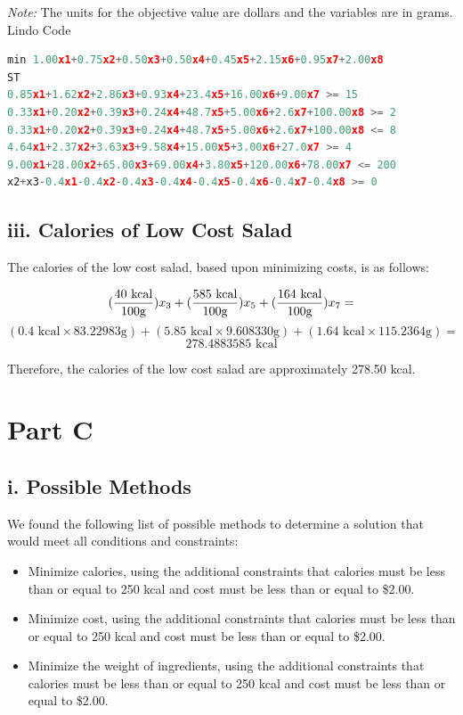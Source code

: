 \documentclass[11pt]{scrreprt}
\begin{document}
{\it Note:} The units for the objective value are dollars and  the variables are in grams.\\

\pagebreak
Lindo Code
\begin{lstlisting}[basicstyle=\small,language=c]
min 1.00x1+0.75x2+0.50x3+0.50x4+0.45x5+2.15x6+0.95x7+2.00x8
ST
0.85x1+1.62x2+2.86x3+0.93x4+23.4x5+16.00x6+9.00x7 >= 15
0.33x1+0.20x2+0.39x3+0.24x4+48.7x5+5.00x6+2.6x7+100.00x8 >= 2
0.33x1+0.20x2+0.39x3+0.24x4+48.7x5+5.00x6+2.6x7+100.00x8 <= 8
4.64x1+2.37x2+3.63x3+9.58x4+15.00x5+3.00x6+27.0x7 >= 4
9.00x1+28.00x2+65.00x3+69.00x4+3.80x5+120.00x6+78.00x7 <= 200
x2+x3-0.4x1-0.4x2-0.4x3-0.4x4-0.4x5-0.4x6-0.4x7-0.4x8 >= 0
\end{lstlisting}

\subsection{iii. Calories of Low Cost Salad}

The calories of the low cost salad, based upon minimizing costs, is as follows:

\begin{displaymath}
({40\text{ kcal} \over 100\text{g}})x_3 + ({585\text{ kcal} \over 100\text{g}})x_5 + ({164\text{ kcal} \over 100\text{g}})x_7 =
\end{displaymath}
\begin{displaymath}
(0.4\text{ kcal} \times 83.22983\text{g}) + (5.85\text{ kcal} \times 9.608330\text{g}) + (1.64\text{ kcal} \times 115.2364\text{g}) =
\end{displaymath}
\begin{displaymath}
278.4883585\text{ kcal}
\end{displaymath}

Therefore, the calories of the low cost salad are approximately 278.50 kcal.

\section{Part C}

\subsection{i. Possible Methods}
We found the following list of possible methods to determine a solution that would meet all conditions and constraints:
\begin{itemize}
	\item Minimize calories, using the additional constraints that calories must be less than or equal to 250 kcal and cost must be less than or equal to \$2.00.
	\item Minimize cost, using the additional constraints that calories must be less than or equal to 250 kcal and cost must be less than or equal to \$2.00.
	\item Minimize the weight of ingredients, using the additional constraints that calories must be less than or equal to 250 kcal and cost must be less than or equal to \$2.00.
\end{itemize}
\end{document}
